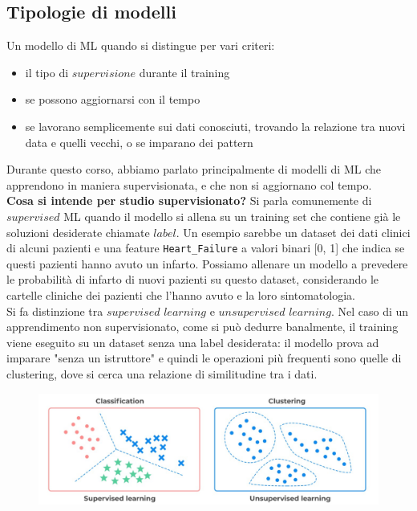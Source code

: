 \subsection{Tipologie di modelli}
Un modello di ML quando si distingue per vari criteri:
\begin{itemize}
    \item il tipo di $supervisione$ durante il training
    \item se possono aggiornarsi con il tempo
    \item se lavorano semplicemente sui dati conosciuti, trovando la relazione tra nuovi data e quelli vecchi, o se imparano dei pattern
\end{itemize}
Durante questo corso, abbiamo parlato principalmente di modelli di ML che apprendono in maniera supervisionata, e che non si aggiornano col tempo. 
\\
\textbf{Cosa si intende per studio supervisionato?} Si parla comunemente di $supervised$ ML quando il modello si allena su un training set che contiene già le soluzioni desiderate chiamate $label$. Un esempio sarebbe un dataset dei dati clinici di alcuni pazienti e una feature \texttt{Heart\_Failure} a valori binari [0, 1] che indica se questi pazienti hanno avuto un infarto. Possiamo allenare un modello a prevedere le probabilità di infarto di nuovi pazienti su questo dataset, considerando le cartelle cliniche dei pazienti che l'hanno avuto e la loro sintomatologia. 
\\
Si fa distinzione tra $supervised$ $learning$ e $unsupervised$ $learning$. Nel caso di un apprendimento non supervisionato, come si può dedurre banalmente, il training viene eseguito su un dataset senza una label desiderata: il modello prova ad imparare "senza un istruttore" e quindi le operazioni più frequenti sono quelle di clustering, dove si cerca una relazione di similitudine tra i dati. 
\\
\begin{figure}[th]
    \centering
    \includegraphics[scale=0.3]{ML/img/sup unsup.png}
    \label{fig:supunsup}
\end{figure}

